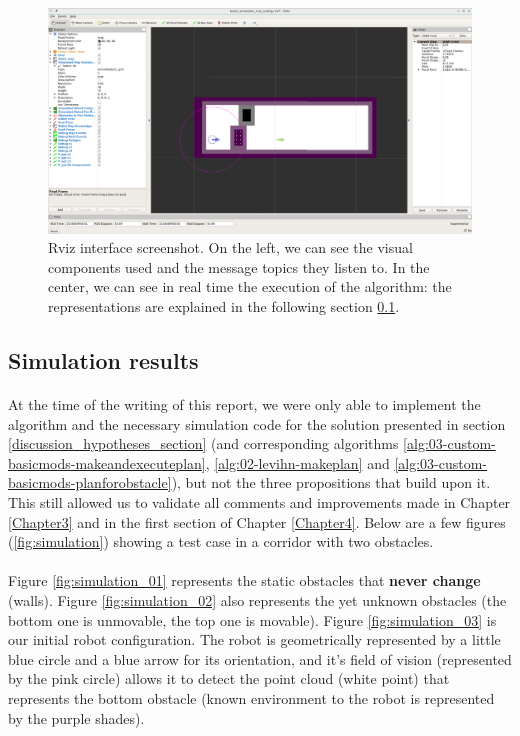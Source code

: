 \begin{figure}[H]
\centering
\includegraphics[width=14cm]{Figures/Simulation/rviz.png}
\caption{Rviz interface screenshot. On the left, we can see the visual components used and the message topics they listen to. In the center, we can see in real time the execution of the algorithm: the representations are explained in the following section \ref{simulation_results_subsection}.}
\label{fig:rviz}
\end{figure}

\subsection{Simulation results}\label{simulation_results_subsection}

\paragraph{} At the time of the writing of this report, we were only able to implement the algorithm and the necessary simulation code for the solution presented in section \ref{discussion_hypotheses_section} (and corresponding algorithms \ref{alg:03-custom-basicmods-makeandexecuteplan}, \ref{alg:02-levihn-makeplan} and \ref{alg:03-custom-basicmods-planforobstacle}), but not the three propositions that build upon it. This still allowed us to validate all comments and improvements made in Chapter \ref{Chapter3} and in the first section of Chapter \ref{Chapter4}. Below are a few figures (\ref{fig:simulation}) showing a test case in a corridor with two obstacles.

\paragraph{} Figure \ref{fig:simulation_01} represents the static obstacles that \textbf{never change} (walls). Figure \ref{fig:simulation_02} also represents the yet unknown obstacles (the bottom one is unmovable, the top one is movable). Figure \ref{fig:simulation_03} is our initial robot configuration. The robot is geometrically represented by a little blue circle and a blue arrow for its orientation, and it's field of vision (represented by the pink circle) allows it to detect the point cloud (white point) that represents the bottom obstacle (known environment to the robot is represented by the purple shades).

